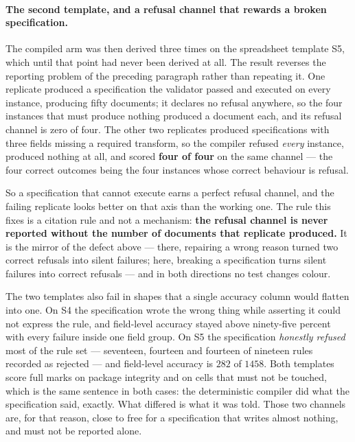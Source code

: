 \paragraph{The second template, and a refusal channel that rewards a broken specification.}
The compiled arm was then derived three times on the spreadsheet template S5, which until that
point had never been derived at all. The result reverses the reporting problem of the preceding
paragraph rather than repeating it. One replicate produced a specification the validator passed
and executed on every instance, producing fifty documents; it declares no refusal anywhere, so
the four instances that must produce nothing produced a document each, and its refusal channel is
zero of four. The other two replicates produced specifications with three fields missing a
required transform, so the compiler refused \emph{every} instance, produced nothing at all, and
scored \textbf{four of four} on the same channel --- the four correct outcomes being the four
instances whose correct behaviour is refusal.

So a specification that cannot execute earns a perfect refusal channel, and the failing replicate
looks better on that axis than the working one. The rule this fixes is a citation rule and not a
mechanism: \textbf{the refusal channel is never reported without the number of documents that
replicate produced.} It is the mirror of the defect above --- there, repairing a wrong reason
turned two correct refusals into silent failures; here, breaking a specification turns silent
failures into correct refusals --- and in both directions no test changes colour.

The two templates also fail in shapes that a single accuracy column would flatten into one. On
S4 the specification wrote the wrong thing while asserting it could not express the rule, and
field-level accuracy stayed above ninety-five percent with every failure inside one field group.
On S5 the specification \emph{honestly refused} most of the rule set --- seventeen, fourteen and
fourteen of nineteen rules recorded as rejected --- and field-level accuracy is $282$ of $1458$.
Both templates score full marks on package integrity and on cells that must not be touched,
which is the same sentence in both cases: the deterministic compiler did what the specification
said, exactly. What differed is what it was told. Those two channels are, for that reason, close
to free for a specification that writes almost nothing, and must not be reported alone.

